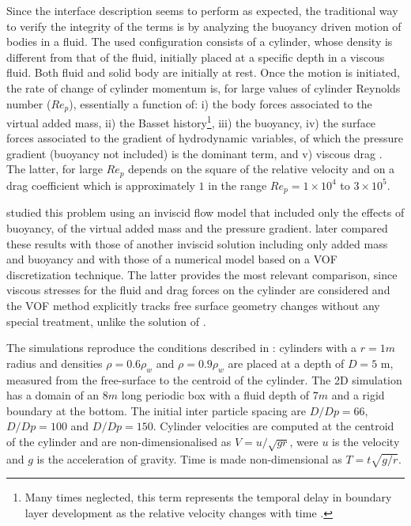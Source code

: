 Since the interface description seems to perform as expected, the traditional way to verify the integrity of the terms is by analyzing the buoyancy driven motion of bodies in a fluid. The used configuration consists of a cylinder, whose density is different from that of the fluid, initially placed at a specific depth in a viscous fluid. Both fluid and solid body are initially at rest. Once the motion is initiated, the rate of change of cylinder momentum is, for large values of cylinder Reynolds number ($Re_p$), essentially a function of: i) the body forces associated to the virtual added mass, ii) the Basset history\footnote{Many times neglected, this term represents the temporal delay in boundary layer development as the relative velocity changes with time \citep{Crowe-1998}.}, iii) the buoyancy, iv) the surface forces associated to the gradient of hydrodynamic variables, of which the pressure gradient (buoyancy not included) is the dominant term, and v) viscous drag \cite{Crowe-1998}. The latter, for large $Re_p$ depends on the square of the relative velocity and on a drag coefficient which is approximately $1$ in the range $Re_p = 1\times 10^4$ to $3\times 10^5$.

\cite{Moyo-2000} studied this problem using an inviscid flow model that included only the effects of buoyancy, of the virtual added mass and the pressure gradient. \cite{Fekken-2004} later compared these results with those of another inviscid solution including only added mass and buoyancy and with those of a numerical model based on a \ac{VOF} discretization technique. The latter provides the most relevant comparison, since viscous stresses for the fluid and drag forces on the cylinder are considered and the \ac{VOF} method explicitly tracks free surface geometry changes without any special treatment, unlike the solution of \cite{Moyo-2000}. 

The simulations reproduce the conditions described in \cite{Fekken-2004}: cylinders with a $r=1m$ radius and densities $\rho=0.6\rho_{w}$ and $\rho=0.9\rho_{w}$ are placed at a depth of $D=5$ m, measured from the free-surface to the centroid of the cylinder. The 2D simulation has a domain of an $8m$ long periodic box with a fluid depth of $7m$ and a rigid boundary at the bottom. The initial inter particle spacing are $D/Dp=66$, $D/Dp=100$ and $D/Dp=150$. Cylinder velocities are computed at the centroid of the cylinder and are non-dimensionalised as $V=u/\sqrt{gr}$, were $u$ is the velocity and $g$ is the acceleration of gravity. Time is made non-dimensional as $T=t\sqrt{g/r}$.

